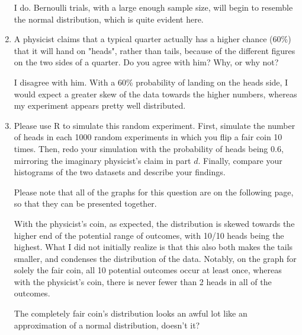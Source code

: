 \documentclass{article}
\begin{document}
\begin{enumerate}[\quad(a)]
	I do. Bernoulli trials, with a large enough sample size, will begin to resemble the normal distribution, which is quite evident here.
	\item A physicist claims that a typical quarter actually has a higher chance ($60\%$) that it will hand on "heads", rather than tails, because of the different figures on the two sides of a quarter. Do you agree with him? Why, or why not?
	
	I disagree with him. With a 60\% probability of landing on the heads side, I would expect a greater skew of the data towards the higher numbers, whereas my experiment appears pretty well distributed.
	\item Please use R to simulate this random experiment. First, simulate the number of heads in each 1000 random experiments in which you flip a fair coin 10 times. Then, redo your simulation with the probability of heads being 0.6, mirroring the imaginary physicist's claim in part $d$. Finally, compare your histograms of the two datasets and describe your findings.
	
	Please note that all of the graphs for this question are on the following page, so that they can be presented together.
	
	With the physicist's coin, as expected, the distribution is skewed towards the higher end of the potential range of outcomes, with 10/10 heads being the highest. What I did not initially realize is that this also both makes the tails smaller, and condenses the distribution of the data. Notably, on the graph for solely the fair coin, all 10 potential outcomes occur at least once, whereas with the physicist's coin, there is never fewer than 2 heads in all of the outcomes.
	
	The completely fair coin's distribution looks an awful lot like an approximation of a normal distribution, doesn't it?
	

\end{enumerate}
\end{document}
